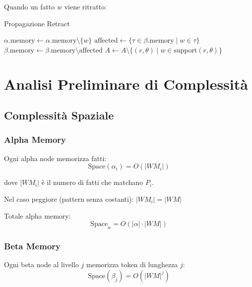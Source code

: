Quando un fatto $w$ viene ritratto:

\begin{algorithm}[H]
\caption{Propagazione Retract}
\begin{algorithmic}[1]
        \State $\alpha.\text{memory} \gets \alpha.\text{memory} \setminus \{w\}$
    \EndFor
        \State $\text{affected} \gets \{\tau \in \beta.\text{memory} \mid w \in \tau\}$
        \State $\beta.\text{memory} \gets \beta.\text{memory} \setminus \text{affected}$
    \EndFor
    \State $A \gets A \setminus \{(r, \theta) \mid w \in \text{support}(r, \theta)\}$
\EndFunction
\end{algorithmic}
\end{algorithm}

\section{Analisi Preliminare di Complessità}

\subsection{Complessità Spaziale}

\subsubsection{Alpha Memory}

Ogni alpha node memorizza fatti:
\begin{equation}
\text{Space}(\alpha_i) = O(|WM_i|)
\end{equation}

dove $|WM_i|$ è il numero di fatti che matchano $P_i$.

Nel caso peggiore (pattern senza costanti): $|WM_i| = |WM|$

Totale alpha memory:
\begin{equation}
\text{Space}_\alpha = O(|\alpha| \cdot |WM|)
\end{equation}

\subsubsection{Beta Memory}

Ogni beta node al livello $j$ memorizza token di lunghezza $j$:
\begin{equation}
\text{Space}(\beta_j) = O(|WM|^j)
\end{equation}

